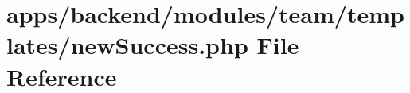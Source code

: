 \hypertarget{backend_2modules_2team_2templates_2new_success_8php}{\section{apps/backend/modules/team/templates/new\-Success.php File Reference}
\label{backend_2modules_2team_2templates_2new_success_8php}
}
